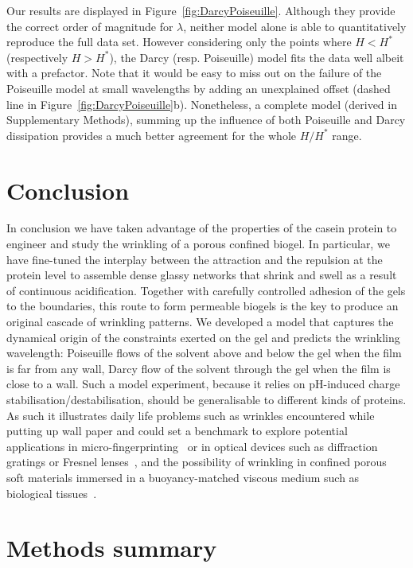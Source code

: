 \documentclass[twocolumn,superscriptaddress,showpacs,preprintnumbers,
amsmath,amssymb,prl]{revtex4-1}
\begin{document}
Our results are displayed in Figure~\ref{fig:DarcyPoiseuille}. Although they provide the correct order of magnitude for $\lambda$, neither model alone is able to quantitatively reproduce the full data set. However considering only the points where $H<H^*$ (respectively $H>H^*$), the Darcy (resp. Poiseuille) model fits the data well albeit with a prefactor. Note that it would be easy to miss out on the failure of the Poiseuille model at small wavelengths by adding an unexplained offset (dashed line in Figure~\ref{fig:DarcyPoiseuille}b). Nonetheless, a complete model (derived in Supplementary Methods), summing up the influence of both Poiseuille and Darcy dissipation provides a much better agreement for the whole $H/H^*$ range.

\section*{Conclusion}

In conclusion we have taken advantage of the properties of the casein protein to engineer and study the wrinkling of a porous confined biogel. In particular, we have fine-tuned the interplay between the attraction and the repulsion at the protein level to assemble dense glassy networks that shrink and swell as a result of continuous acidification. Together with carefully controlled adhesion of the gels to the boundaries, this route to form permeable biogels is the key to produce an original cascade of wrinkling patterns. We developed a model that captures the dynamical origin of the constraints exerted on the gel and predicts the wrinkling wavelength: Poiseuille flows of the solvent above and below the gel when the film is far from any wall, Darcy flow of the solvent through the gel when the film is close to a wall. Such a model experiment, because it relies on pH-induced charge stabilisation/destabilisation, should be generalisable to different kinds of proteins. As such it illustrates daily life problems such as wrinkles encountered while putting up wall paper and could set a benchmark to explore potential applications in micro-fingerprinting~\cite{Bae2015} or in optical devices such as diffraction gratings or Fresnel lenses~\cite{Li2013}, and the possibility of wrinkling in confined porous soft materials immersed in a buoyancy-matched viscous medium such as biological tissues~\cite{Ma2004,Longley2013,Fleury2015}.



\section*{Methods summary}
\end{document}
